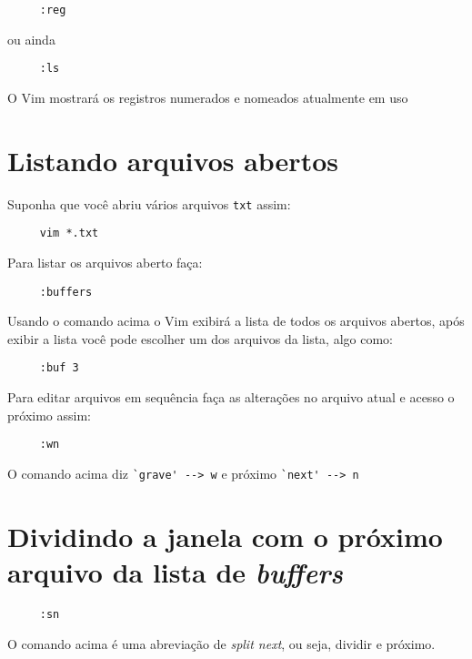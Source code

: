 \begin{verbatim}
     :reg
\end{verbatim}

ou ainda

\begin{verbatim}
     :ls
\end{verbatim}

O Vim mostrará os registros numerados e nomeados atualmente em uso

\section{Listando arquivos abertos}
\label{Listando arquivos abertos}
Suponha que você abriu vários arquivos {\tt txt} assim:

\begin{verbatim}
     vim *.txt
\end{verbatim}

Para listar os arquivos aberto faça:

\begin{verbatim}
     :buffers
\end{verbatim}

Usando o comando acima o Vim exibirá a lista de todos os arquivos
abertos, após exibir a lista você pode escolher um dos arquivos da
lista, algo como:

\begin{verbatim}
     :buf 3
\end{verbatim}

Para editar arquivos em sequência faça as alterações no arquivo atual
e acesso o próximo assim:

\begin{verbatim}
     :wn
\end{verbatim}

O comando acima diz \verb|`grave' --> w|  e próximo \verb|`next' --> n|

\section{Dividindo a janela com o próximo arquivo da lista de {\em buffers}}
\label{Dividindo a janela com o próximo arquivo da lista de buffers}

\begin{verbatim}
     :sn
\end{verbatim}

O comando acima é uma abreviação de {\em split next}, ou seja, dividir e próximo.


